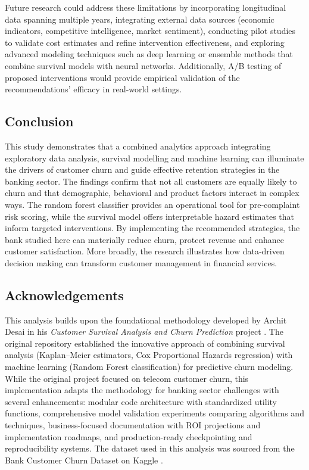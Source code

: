 \documentclass[12pt]{article}
\begin{document}
Future research could address these limitations by incorporating longitudinal data spanning multiple years, integrating external data sources (economic indicators, competitive intelligence, market sentiment), conducting pilot studies to validate cost estimates and refine intervention effectiveness, and exploring advanced modeling techniques such as deep learning or ensemble methods that combine survival models with neural networks.  Additionally, A/B testing of proposed interventions would provide empirical validation of the recommendations' efficacy in real‑world settings.

\subsection{Conclusion}
This study demonstrates that a combined analytics approach integrating exploratory data analysis, survival modelling and machine learning can illuminate the drivers of customer churn and guide effective retention strategies in the banking sector.  The findings confirm that not all customers are equally likely to churn and that demographic, behavioral and product factors interact in complex ways.  The random forest classifier provides an operational tool for pre‑complaint risk scoring, while the survival model offers interpretable hazard estimates that inform targeted interventions.  By implementing the recommended strategies, the bank studied here can materially reduce churn, protect revenue and enhance customer satisfaction.  More broadly, the research illustrates how data‑driven decision making can transform customer management in financial services.

\subsection{Acknowledgements}
This analysis builds upon the foundational methodology developed by Archit Desai in his \emph{Customer Survival Analysis and Churn Prediction} project \citep{desai_customer_survival}.  The original repository established the innovative approach of combining survival analysis (Kaplan–Meier estimators, Cox Proportional Hazards regression) with machine learning (Random Forest classification) for predictive churn modeling.  While the original project focused on telecom customer churn, this implementation adapts the methodology for banking sector challenges with several enhancements: modular code architecture with standardized utility functions, comprehensive model validation experiments comparing algorithms and techniques, business-focused documentation with ROI projections and implementation roadmaps, and production-ready checkpointing and reproducibility systems.  The dataset used in this analysis was sourced from the Bank Customer Churn Dataset on Kaggle \citep{kollipara2022bank}.

\newpage


\end{document}
